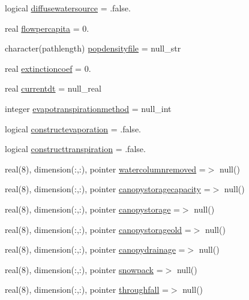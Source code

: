 \begin{DoxyCompactItemize}
\item 
logical \mbox{\hyperlink{structmodulebasin_1_1t__basin_ab586262ec54ef8eb4afe052e2d1e9aec}{diffusewatersource}} = .false.
\item 
real \mbox{\hyperlink{structmodulebasin_1_1t__basin_a075d87c76f475f79e14ec60c2e1b66a1}{flowpercapita}} = 0.
\item 
character(pathlength) \mbox{\hyperlink{structmodulebasin_1_1t__basin_aeaabf304a8e51611fbcf01d6ac704c80}{popdensityfile}} = null\+\_\+str
\item 
real \mbox{\hyperlink{structmodulebasin_1_1t__basin_ad410f943931837bf28dd89f4d3977d33}{extinctioncoef}} = 0.
\item 
real \mbox{\hyperlink{structmodulebasin_1_1t__basin_ab99fe747e3c5b3c9410da0ef774d6888}{currentdt}} = null\+\_\+real
\item 
integer \mbox{\hyperlink{structmodulebasin_1_1t__basin_a425804451132ac89beb22462abc78245}{evapotranspirationmethod}} = null\+\_\+int
\item 
logical \mbox{\hyperlink{structmodulebasin_1_1t__basin_a37672481afedb1beadb1a7410d4b4964}{constructevaporation}} = .false.
\item 
logical \mbox{\hyperlink{structmodulebasin_1_1t__basin_a546d909486f80cfe0bc957dd96567fdc}{constructtranspiration}} = .false.
\item 
real(8), dimension(\+:,\+:), pointer \mbox{\hyperlink{structmodulebasin_1_1t__basin_a05871c7b9a1a6c1585b6a8b7613012f3}{watercolumnremoved}} =$>$ null()
\item 
real(8), dimension(\+:,\+:), pointer \mbox{\hyperlink{structmodulebasin_1_1t__basin_acf227b4b80c4ba3494ea051d66ef03a0}{canopystoragecapacity}} =$>$ null()
\item 
real(8), dimension(\+:,\+:), pointer \mbox{\hyperlink{structmodulebasin_1_1t__basin_a1b4b2bb595c9b39fda179e8f9745f320}{canopystorage}} =$>$ null()
\item 
real(8), dimension(\+:,\+:), pointer \mbox{\hyperlink{structmodulebasin_1_1t__basin_a884298a3796706c1ed4c0d2040c9f72d}{canopystorageold}} =$>$ null()
\item 
real(8), dimension(\+:,\+:), pointer \mbox{\hyperlink{structmodulebasin_1_1t__basin_a79cd280fde993a11a7a2c406037bfd03}{canopydrainage}} =$>$ null()
\item 
real(8), dimension(\+:,\+:), pointer \mbox{\hyperlink{structmodulebasin_1_1t__basin_a92c9c26b51b0b95efbdee62d8d4040a9}{snowpack}} =$>$ null()
\item 
real(8), dimension(\+:,\+:), pointer \mbox{\hyperlink{structmodulebasin_1_1t__basin_af07f50dea1f37cbdb1624f2340725e79}{throughfall}} =$>$ null()

\end{DoxyCompactItemize}
